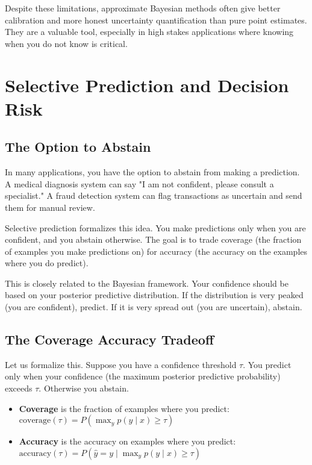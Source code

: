 Despite these limitations, approximate Bayesian methods often give better calibration and more honest uncertainty quantification than pure point estimates. They are a valuable tool, especially in high stakes applications where knowing when you do not know is critical.

\vspace{2em}

\section{Selective Prediction and Decision Risk}

\subsection{The Option to Abstain}

In many applications, you have the option to abstain from making a prediction. A medical diagnosis system can say "I am not confident, please consult a specialist." A fraud detection system can flag transactions as uncertain and send them for manual review.

Selective prediction formalizes this idea. You make predictions only when you are confident, and you abstain otherwise. The goal is to trade coverage (the fraction of examples you make predictions on) for accuracy (the accuracy on the examples where you do predict).

This is closely related to the Bayesian framework. Your confidence should be based on your posterior predictive distribution. If the distribution is very peaked (you are confident), predict. If it is very spread out (you are uncertain), abstain.

\subsection{The Coverage Accuracy Tradeoff}

Let us formalize this. Suppose you have a confidence threshold $\tau$. You predict only when your confidence (the maximum posterior predictive probability) exceeds $\tau$. Otherwise you abstain.

\begin{itemize}
\item \textbf{Coverage} is the fraction of examples where you predict: $\text{coverage}(\tau) = P(\max_y p(y \mid x) \geq \tau)$

\item \textbf{Accuracy} is the accuracy on examples where you predict: $\text{accuracy}(\tau) = P(\hat{y} = y \mid \max_y p(y \mid x) \geq \tau)$
\end{itemize}

